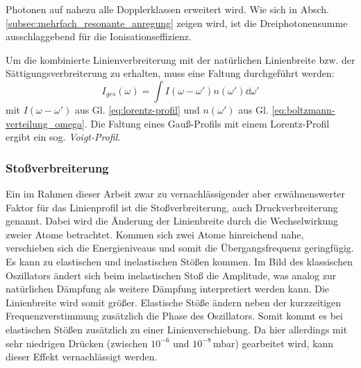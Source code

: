 Photonen auf nahezu alle Dopplerklassen erweitert wird. Wie sich in Absch.
\ref{subsec:mehrfach_resonante_anregung} zeigen wird, ist die
Dreiphotonensumme ausschlaggebend für die Ionisationseffizienz.\par
Um die kombinierte Linienverbreiterung mit der natürlichen Linienbreite bzw. der
Sättigungsverbreiterung zu erhalten, muss eine Faltung durchgeführt werden:
\begin{equation}\label{eq:voigt_doppler}
	I_{ges}(\omega)=\int{I(\omega-\omega')n(\omega')\dd\omega'}
\end{equation}
mit $I(\omega-\omega')$ aus Gl. \eqref{eq:lorentz-profil} und $n(\omega')$ aus
Gl. \eqref{eq:boltzmann-verteilung_omega}. Die Faltung eines Gauß-Profils mit
einem Lorentz-Profil ergibt ein sog. \textit{Voigt-Profil}.

\subsubsection{Stoßverbreiterung}\label{subsubsec:stossverbreiterung}
Ein im Rahmen dieser Arbeit zwar zu vernachlässigender aber erwähnenswerter
Faktor für das Linienprofil ist die Stoßverbreiterung, auch
Druckverbreiterung genannt. Dabei wird die Änderung der Linienbreite durch die
Wechselwirkung zweier Atome betrachtet. Kommen sich zwei Atome hinreichend nahe,
verschieben sich die Energieniveaus und somit die Übergangsfrequenz geringfügig. Es kann zu
elastischen und inelastischen Stößen kommen. Im Bild des klassischen Oszillators
ändert sich beim inelastischen Stoß die Amplitude, was analog zur natürlichen
Dämpfung als weitere Dämpfung interpretiert werden kann. Die Linienbreite wird
somit größer. Elastische Stöße ändern neben der kurzzeitigen Frequenzverstimmung
zusätzlich die Phase des Oszillators. Somit kommt es bei elastischen Stößen
zusätzlich zu einer Linienverschiebung. Da hier allerdings mit
sehr niedrigen Drücken (zwischen $10^{-6}$ und $10^{-8}\,$mbar) gearbeitet wird, kann dieser Effekt vernachlässigt werden.

